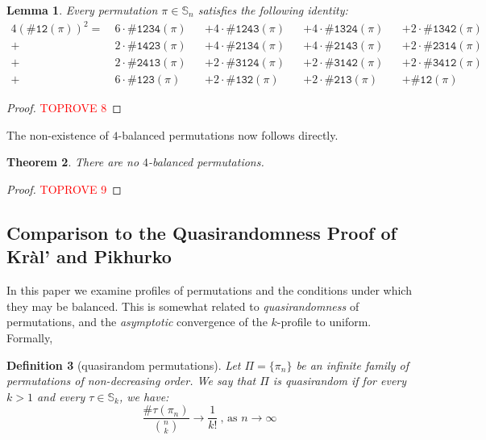 \documentclass{article}
\newtheorem{theorem}{Theorem}[section]
\newtheorem{lemma}[theorem]{Lemma}
\newtheorem{definition}[theorem]{Definition}
\newcommand{\Sn}{\mathbb{S}_n}
\newcommand{\pc}[2]{{\# \mathtt{ #1 } \left( #2 \right)}}
\theoremstyle{remark}
\theoremstyle{plain}
\begin{document}
\begin{lemma}
    \label{lemma:relation_2_3_4_profile}
    Every permutation $\pi \in \Sn$ satisfies the following identity: 
    \begin{alignat*}{4}
        \left( \pc{12}{\pi} \right)^2 =\ &6 \cdot \pc{1234}{\pi} &&+ 4 \cdot \pc{1243}{\pi} &&+ 4 \cdot \pc{1324}{\pi} &&+ 2 \cdot \pc{1342}{\pi} \\
        +\ &2 \cdot \pc{1423}{\pi} &&+ 4 \cdot \pc{2134}{\pi} &&+ 4 \cdot \pc{2143}{\pi} &&+ 2 \cdot \pc{2314}{\pi} \\
        +\ &2 \cdot \pc{2413}{\pi} &&+ 2 \cdot \pc{3124}{\pi} &&+ 2 \cdot \pc{3142}{\pi} &&+ 2 \cdot \pc{3412}{\pi} \\
        +\ &6 \cdot \pc{123}{\pi} &&+ 2 \cdot \pc{132}{\pi} &&+ 2 \cdot \pc{213}{\pi} &&+ \pc{12}{\pi}
    \end{alignat*}
\end{lemma}
\begin{proof}\textcolor{red}{TOPROVE 8}\end{proof}

The non-existence of $4$-balanced permutations now follows directly.

\begin{theorem}
    \label{thm:no_4balanced}
    There are no $4$-balanced permutations.
\end{theorem}
\begin{proof}\textcolor{red}{TOPROVE 9}\end{proof}

\subsection{Comparison to the Quasirandomness Proof of Kr\`al' and Pikhurko}
\label{subsect:comparison_kp}

In this paper we examine profiles of permutations and the conditions under which they may be balanced. This is somewhat related to \emph{quasirandomness} of permutations, and the {\em asymptotic} convergence of the $k$-profile to uniform. Formally,

\begin{definition}[quasirandom permutations] 
    \label{defn:quasirandom}
    Let $\Pi = \{ \pi_n \}$ be an infinite family of permutations of non-decreasing order. We say that $\Pi$ is quasirandom if for every $k > 1$ and every $\tau \in \mathbb{S}_k$, we have:
    \[
        \frac{\pc{\tau}{\pi_n}}{\binom{n}{k}} \to \frac{1}{k!} \ \text{, as } n \to \infty 
    \]
\end{definition}
\end{document}
